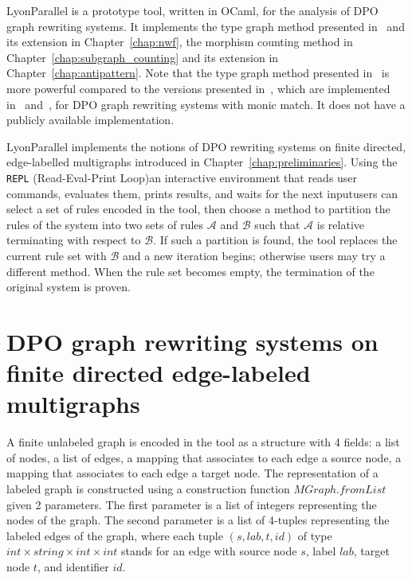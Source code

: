 LyonParallel is a prototype tool, written in OCaml, for the analysis of DPO graph rewriting systems.
It implements the type graph method presented in~\cite{endrullis2024generalized_icgt} and its extension in Chapter~\ref{chap:nwf}, the morphism counting method in Chapter~\ref{chap:subgraph_counting} and its extension in Chapter~\ref{chap:antipattern}. Note that the type graph method presented in~\cite{endrullis2024generalized_icgt} is more powerful compared to the versions presented in~\cite{zantema2014termination,bruggink2014termination,bruggink2015proving}, which are implemented in~\cite{TORPAcyc} and~\cite{grez}, for DPO graph rewriting systems with monic match. It does not have a publicly available implementation. 

 
LyonParallel implements the notions of DPO rewriting systems on finite directed, edge-labelled multigraphs introduced in Chapter~\ref{chap:preliminaries}. Using the \texttt{REPL} (Read-Eval-Print Loop)\textemdash an interactive environment that reads user commands, evaluates them, prints results, and waits for the next input\textemdash users can select a set of rules encoded in the tool, then choose a method to partition the rules of the system into two sets of rules $\mathcal{A}$ and $\mathcal{B}$ such that $\mathcal{A}$ is relative terminating with respect to $\mathcal{B}$. If such a partition is found, the tool replaces the current rule set with \(\mathcal{B}\) and a new iteration begins; otherwise users may try a different method. When the rule set becomes empty, the termination of the original system is proven.
\section{DPO graph rewriting systems on finite directed edge-labeled multigraphs}
\label{lyonparallel:sec:implementation_of_dpo_graph_rewriting_systems}
A finite unlabeled graph is encoded in the tool as a structure with 4 fields: a list of nodes, a list of edges, a mapping that associates to each edge a source node, a mapping that associates to each edge a target node. 
The representation of a labeled graph is constructed using a construction function \colorbox{Ivory2}{$MGraph.fromList$} given 2 parameters. The first parameter is a list of integers representing the nodes of the graph. The second parameter is a list of 4-tuples representing the labeled edges of the graph, where each tuple \colorbox{Ivory2}{$(s,lab,t,id)$} of type \colorbox{Ivory2}{$\textit{int}\times \textit{string}\times \textit{int}\times \textit{int}$} stands for an edge with source node $s$, label $lab$, target node $t$, and identifier $id$.

